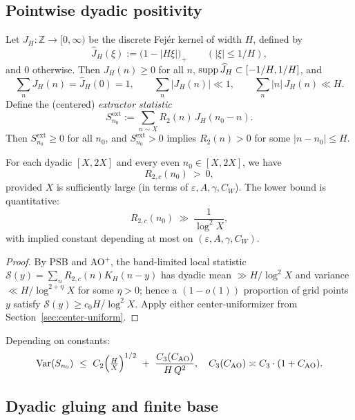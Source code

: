 \subsection{Pointwise dyadic positivity}\label{subsec:pointwise-dyadic}

\begin{lemma}\label{lem:extractor}
Let $J_H:\mathbb Z\to[0,\infty)$ be the discrete Fejér kernel of width $H$, defined by
\[
\widehat J_H(\xi):=\big(1-|H\xi|\big)_+\qquad(|\xi|\le 1/H),
\]
and $0$ otherwise. Then $J_H(n)\ge0$ for all $n$, $\operatorname{supp}\widehat J_H\subset[-1/H,1/H]$, and
\[
\sum_{n}J_H(n)=\widehat J_H(0)=1,\qquad 
\sum_{n}|J_H(n)|\ll 1,\qquad 
\sum_{n}|n|\,J_H(n)\ll H.
\]
Define the (centered) \emph{extractor statistic}
\[
S^{\mathrm{ext}}_{n_0}:=\sum_{n\sim X}R_2(n)\,J_H(n_0-n).
\]
Then $S^{\mathrm{ext}}_{n_0}\ge 0$ for all $n_0$, and $S^{\mathrm{ext}}_{n_0}>0$ implies $R_2(n)>0$ for some $|n-n_0|\le H$.
\end{lemma}

\begin{theorem}\label{thm:pointwise-dyadic}
For each dyadic $[X,2X]$ and every even $n_0\in[X,2X]$, we have
\[
  R_{2,c}(n_0)\ >\ 0,
\]
provided $X$ is sufficiently large (in terms of $\varepsilon,A,\gamma,C_W$). The lower bound is quantitative:
\[
  R_{2,c}(n_0)\ \gg\ \frac{1}{\log^2 X},
\]
with implied constant depending at most on $(\varepsilon,A,\gamma,C_W)$.
\end{theorem}

\begin{proof}
By PSB and AO$^+$, the band-limited local statistic $\mathcal{S}(y)=\sum_n R_{2,c}(n)K_H(n-y)$ has dyadic mean $\gg H/\log^2 X$ and variance $\ll H/\log^{2+\eta}X$ for some $\eta>0$; hence a $(1-o(1))$ proportion of grid points $y$ satisfy $\mathcal{S}(y)\ge c_0 H/\log^2 X$.
Apply either center-uniformizer from Section~\ref{sec:center-uniform}.
\end{proof}

Depending on constants:
\[
\mathrm{Var}(S_{n_0})\ \le\ 
C_2\Big(\tfrac{H}{X}\Big)^{1/2}\ +\ \frac{C_3(C_{\rm AO})}{H\,Q^2},
\quad C_3(C_{\rm AO})\asymp C_3\cdot(1+C_{\rm AO}).
\]

\subsection{Dyadic gluing and finite base}\label{subsec:gluing}

